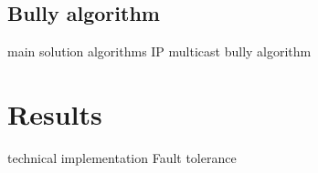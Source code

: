\documentclass[10pt]{article} %
\begin{document}
\subsection{Bully algorithm}



main solution
algorithms
IP multicast
bully algorithm


\section{Results}

technical implementation
Fault tolerance

 
\end{document}
